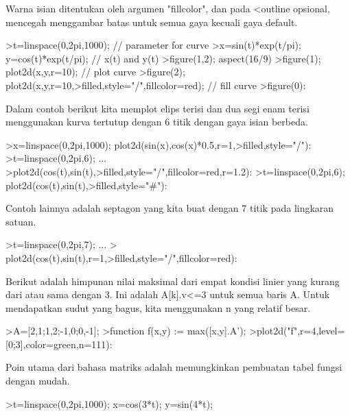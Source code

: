 \documentclass{article}
\begin{document}
\begin{eulernotebook}
\begin{eulercomment}
\begin{eulercomment}
\begin{eulercomment}
\begin{eulercomment}
\begin{eulercomment}
\begin{eulercomment}
\begin{eulercomment}
Warna isian ditentukan oleh argumen "fillcolor", dan pada \textless{}outline
opsional, mencegah menggambar batas untuk semua gaya kecuali gaya
default.
\end{eulercomment}
\begin{eulerprompt}
>t=linspace(0,2pi,1000); // parameter for curve
>x=sin(t)*exp(t/pi); y=cos(t)*exp(t/pi); // x(t) and y(t)
>figure(1,2); aspect(16/9)
>figure(1); plot2d(x,y,r=10); // plot curve
>figure(2); plot2d(x,y,r=10,>filled,style="/",fillcolor=red); // fill curve
>figure(0):
\end{eulerprompt}
\begin{eulercomment}
Dalam contoh berikut kita memplot elips terisi dan dua segi enam
terisi menggunakan kurva tertutup dengan 6 titik dengan gaya isian
berbeda.
\end{eulercomment}
\begin{eulerprompt}
>x=linspace(0,2pi,1000); plot2d(sin(x),cos(x)*0.5,r=1,>filled,style="/"):
>t=linspace(0,2pi,6); ...
>plot2d(cos(t),sin(t),>filled,style="/",fillcolor=red,r=1.2):
>t=linspace(0,2pi,6); plot2d(cos(t),sin(t),>filled,style="#"):
\end{eulerprompt}
\begin{eulercomment}
Contoh lainnya adalah septagon yang kita buat dengan 7 titik pada
lingkaran satuan.
\end{eulercomment}
\begin{eulerprompt}
>t=linspace(0,2pi,7);  ...
> plot2d(cos(t),sin(t),r=1,>filled,style="/",fillcolor=red):
\end{eulerprompt}
\begin{eulercomment}
Berikut adalah himpunan nilai maksimal dari empat kondisi linier yang
kurang dari atau sama dengan 3. Ini adalah A[k].v\textless{}=3 untuk semua baris
A. Untuk mendapatkan sudut yang bagus, kita menggunakan n yang relatif
besar.
\end{eulercomment}
\begin{eulerprompt}
>A=[2,1;1,2;-1,0;0,-1];
>function f(x,y) := max([x,y].A');
>plot2d("f",r=4,level=[0;3],color=green,n=111):
\end{eulerprompt}
\begin{eulercomment}
Poin utama dari bahasa matriks adalah memungkinkan pembuatan tabel
fungsi dengan mudah.
\end{eulercomment}
\begin{eulerprompt}
>t=linspace(0,2pi,1000); x=cos(3*t); y=sin(4*t);
\end{eulerprompt}
\begin{eulercomment}

\end{eulercomment}
\end{eulercomment}
\end{eulercomment}
\end{eulercomment}
\end{eulercomment}
\end{eulercomment}
\end{eulercomment}
\end{eulernotebook}
\end{document}
